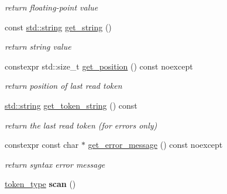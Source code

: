 \begin{DoxyCompactItemize}
\begin{DoxyCompactList}\small\item\em return floating-\/point value \end{DoxyCompactList}\item 
const \hyperlink{namespacenlohmann_1_1detail_a90aa5ef615aa8305e9ea20d8a947980fab45cffe084dd3d20d928bee85e7b0f21}{std\+::string} \hyperlink{classnlohmann_1_1detail_1_1lexer_a61e3bf22aa79c402f26670560b6198b0}{get\+\_\+string} ()\hypertarget{classnlohmann_1_1detail_1_1lexer_a61e3bf22aa79c402f26670560b6198b0}{}\label{classnlohmann_1_1detail_1_1lexer_a61e3bf22aa79c402f26670560b6198b0}

\begin{DoxyCompactList}\small\item\em return string value \end{DoxyCompactList}\item 
constexpr std\+::size\+\_\+t \hyperlink{classnlohmann_1_1detail_1_1lexer_a2a00465a3d5d70c84809cdb27658db79}{get\+\_\+position} () const noexcept\hypertarget{classnlohmann_1_1detail_1_1lexer_a2a00465a3d5d70c84809cdb27658db79}{}\label{classnlohmann_1_1detail_1_1lexer_a2a00465a3d5d70c84809cdb27658db79}

\begin{DoxyCompactList}\small\item\em return position of last read token \end{DoxyCompactList}\item 
\hyperlink{namespacenlohmann_1_1detail_a90aa5ef615aa8305e9ea20d8a947980fab45cffe084dd3d20d928bee85e7b0f21}{std\+::string} \hyperlink{classnlohmann_1_1detail_1_1lexer_a6d8a58be845717a86726756372414cbb}{get\+\_\+token\+\_\+string} () const \hypertarget{classnlohmann_1_1detail_1_1lexer_a6d8a58be845717a86726756372414cbb}{}\label{classnlohmann_1_1detail_1_1lexer_a6d8a58be845717a86726756372414cbb}

\begin{DoxyCompactList}\small\item\em return the last read token (for errors only) \end{DoxyCompactList}\item 
constexpr const char $\ast$ \hyperlink{classnlohmann_1_1detail_1_1lexer_a53cebbc684ef97fa49651eb442d58f86}{get\+\_\+error\+\_\+message} () const noexcept\hypertarget{classnlohmann_1_1detail_1_1lexer_a53cebbc684ef97fa49651eb442d58f86}{}\label{classnlohmann_1_1detail_1_1lexer_a53cebbc684ef97fa49651eb442d58f86}

\begin{DoxyCompactList}\small\item\em return syntax error message \end{DoxyCompactList}\item 
\hyperlink{classnlohmann_1_1detail_1_1lexer_a3f313cdbe187cababfc5e06f0b69b098}{token\+\_\+type} {\bfseries scan} ()\hypertarget{classnlohmann_1_1detail_1_1lexer_aac3041cd2b9291e64fee38db422863c9}{}\label{classnlohmann_1_1detail_1_1lexer_aac3041cd2b9291e64fee38db422863c9}

\end{DoxyCompactItemize}
